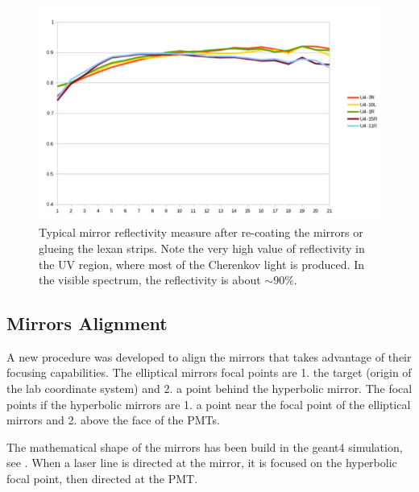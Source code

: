 \begin{figure}[b]
	\centering
	\includegraphics[width=0.95\columnwidth,keepaspectratio]{img/mirrorsReflectivityAfter.png}
	\caption{Typical mirror reflectivity measure after re-coating the mirrors or glueing the lexan strips. Note the very high value of reflectivity
		     in the UV region, where most of the Cherenkov light is produced. In the visible spectrum, the reflectivity is about $\sim 90\%$.}
	\label{fig:reflectivityAfter}
\end{figure}

\subsection{Mirrors Alignment}

A new procedure was developed to align the mirrors that takes advantage of their focusing capabilities. The elliptical mirrors focal points are 1. the target
(origin of the lab coordinate system)
and 2. a point behind the hyperbolic mirror. The focal points if the hyperbolic mirrors are 1. a point near the focal point of the elliptical mirrors and
2. above the face of the PMTs.

The mathematical shape of the mirrors has been build in the geant4 simulation, see . When a laser line is directed at the mirror,
it is focused on the hyperbolic focal point, then directed at the PMT.


